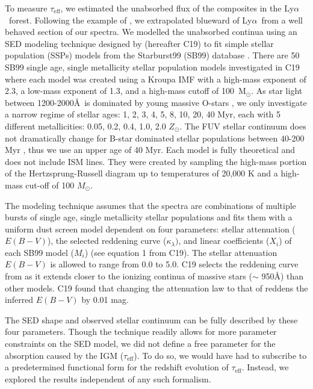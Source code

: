 \documentclass[twocolumn,tight,times]{aastex63}
\newcommand{\mteff}{\tau_\mathrm{eff}}
\newcommand{\teff}{$\mteff$}
\newcommand{\lya}{Ly$\alpha$}
\begin{document}
To measure \teff, we estimated the unabsorbed flux of the composites in the \lya\ forest. Following the example of \cite{Paris_2011}, we extrapolated blueward of \lya\ from a well behaved section of our spectra. We modelled the unabsorbed continua using an SED modeling technique designed by \cite{Chisholm_2019} (hereafter C19) to fit simple stellar population (SSPs) models from the Starburst99 (SB99) database \citep{Leitherer_1999}. There are 50 SB99 single age, single metallicity stellar population models investigated in C19 where each model was created using  a Kroupa IMF with a high-mass exponent of 2.3, a low-mass exponent of 1.3, and a high-mass cutoff of 100~M$_\odot$. As star light between 1200-2000\AA\ is dominated by young massive O-stars \citep{Leitherer_1999}, we only investigate a narrow regime of stellar ages: 1, 2, 3, 4, 5, 8, 10, 20, 40 Myr, each with 5 different metallicities: 0.05, 0.2, 0.4, 1.0, 2.0 $Z_\odot$. The FUV stellar continuum does not dramatically change for B-star dominated stellar populations between 40-200 Myr \citep{de_Mello_2000, Rix_2004}, thus we use an upper age of 40 Myr. Each model is fully theoretical and does not include ISM lines. They were created by sampling the high-mass portion of the Hertzsprung-Russell diagram up to temperatures of 20,000 K and a high-mass cut-off of 100 $M_{\odot}$.

The modeling technique assumes that the spectra are combinations of multiple bursts of single age, single metallicity stellar populations and fits them with a uniform dust screen model dependent on four parameters: stellar attenuation ($E(B-V)$), the selected reddening curve ($\kappa_{\lambda})$, and linear coefficients ($X_{i}$) of each SB99 model ($M_{i}$) (see equation 1 from C19). The stellar attenuation $E(B-V)$ is allowed to range from 0.0 to 5.0. C19 selects the reddening curve from \cite{Reddy_2016} as it extends closer to the ionizing continua of massive stars ($\sim$ 950\AA) than other models. C19 found that changing the attenuation law to that of \cite{Calzetti_2000} reddens the inferred $E(B-V)$ by 0.01 mag.

The SED shape and observed stellar continuum can be fully described by these four parameters. Though the technique readily allows for more parameter constraints on the SED model, we did not define a free parameter for the absorption caused by the IGM (\teff). To do so, we would have had to subscribe to a predetermined functional form for the redshift evolution of \teff. Instead, we explored the results independent of any such formalism.
\end{document}
